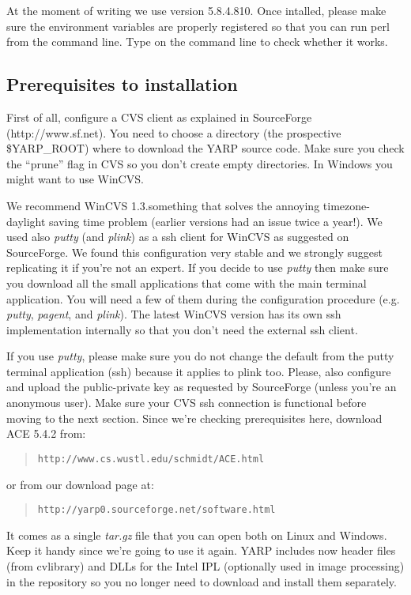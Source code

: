 At the moment of writing we use version 5.8.4.810. Once intalled, please make sure the environment variables are properly registered so that you can run perl from the command line.
Type  on the command line to check whether it works.

\subsection{Prerequisites to installation}

First of all, configure a CVS client as explained in SourceForge (http://www.sf.net).
You need to choose a directory (the prospective \$YARP\_ROOT) where to download the
YARP source code. Make sure you check the ``prune'' flag in CVS so you don't create
empty directories. In Windows you might want to use WinCVS.

We recommend WinCVS 1.3.something that solves the annoying timezone-daylight saving time
problem (earlier versions had an issue twice a year!). We used also {\em putty} (and {\em plink}) as a ssh client for WinCVS as suggested on SourceForge. We found this configuration very stable and we strongly suggest replicating it if you're not an expert. 
If you decide to use {\em putty} then make sure you download all the small applications that come with the main terminal application. You will need a few of them during the configuration procedure (e.g. {\em putty}, {\em pagent}, and {\em plink}). The latest WinCVS version has its own ssh implementation internally so that you don't need the external ssh client.

If you use {\em putty}, please make sure you do not change the default from the putty terminal application (ssh)
because it applies to plink too. Please, also configure and upload the public-private key as requested by SourceForge (unless you're an anonymous user). Make sure your CVS ssh connection is functional before moving to the next section. Since we're checking prerequisites here, download ACE 5.4.2 from:

\begin{quote}
{\tt http://www.cs.wustl.edu/schmidt/ACE.html}
\end{quote}

\noindent or from our download page at:
\begin{quote}
{\tt http://yarp0.sourceforge.net/software.html}
\end{quote}

It comes as a single {\em tar.gz} file that you can open both on Linux and Windows. Keep it handy since we're going to use it again. YARP includes now header files (from cvlibrary) and DLLs for the Intel IPL (optionally used in image processing) in the repository so you no longer need to download and install them separately.

